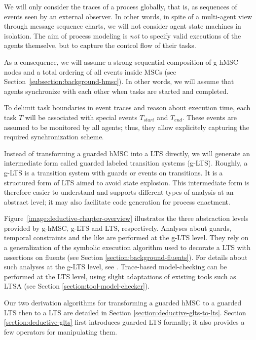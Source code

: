 We will only consider the traces of a process globally, that is, as sequences of events seen by an external observer. In other words, in spite of a multi-agent view through message sequence charts, we will not consider agent state machines in isolation. The aim of process modeling is \emph{not} to specify valid executions of the agents themselve, but to capture the control flow of their tasks. 

As a consequence, we will assume a strong sequential composition of g-hMSC nodes and a total ordering of all events inside MSCs (see Section~\ref{subsection:background-hmsc}). In other words, we will assume that agents synchronize with each other when tasks are started and completed. 

To delimit task boundaries in event traces and reason about execution time, each task $T$ will be associated with special events $T_{start}$ and $T_{end}$. These events are assumed to be monitored by all agents; thus, they allow explicitely capturing the required synchronization scheme.

Instead of transforming a guarded hMSC into a LTS directly, we will generate an intermediate form called guarded labeled transition systems (g-LTS). Roughly, a g-LTS is a transition system with guards or events on transitions. It is a structured form of LTS aimed to avoid state explosion. This intermediate form is therefore easier to understand and supports different types of analysis at an abstract level; it may also facilitate code generation for process enactment. 

Figure~\ref{image:deductive-chapter-overview} illustrates the three abstraction levels provided by g-hMSC, g-LTS and LTS, respectively. Analyses about guards, temporal constraints and the like are performed at the g-LTS level. They rely on a generalization of the symbolic execution algorithm used to decorate a LTS with assertions on fluents (see Section \ref{section:background-fluents}). For details about such analyses at the g-LTS level, see \cite{Damas:2011}. Trace-based model-checking can be performed at the LTS level, using slight adaptations of existing tools such as LTSA \cite{Magee:1999} (see Section \ref{section:tool-model-checker}).

Our two derivation algorithms for transforming a guarded hMSC to a guarded LTS then to a LTS are detailed in Section \ref{section:deductive-glts-to-lts}. Section \ref{section:deductive-glts} first introduces guarded LTS formally; it also provides a few operators for manipulating them.
